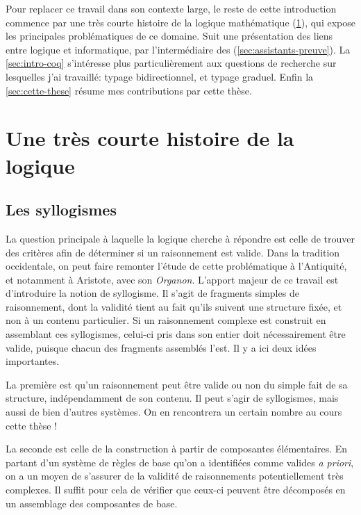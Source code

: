 Pour replacer ce travail dans son contexte large, le reste de cette introduction
commence par une très courte histoire de la logique mathématique
(\cref{sec:logique-histoire}), qui expose les principales problématiques de ce domaine.
Suit une présentation des liens entre logique et informatique, par
l’intermédiaire des  (\cref{sec:assistants-preuve}).
La \cref{sec:intro-coq} s’intéresse plus particulièrement aux questions
de recherche sur lesquelles j’ai travaillé: typage bidirectionnel,  et typage
graduel.
Enfin la \cref{sec:cette-these} résume mes contributions par cette thèse.

\section{Une très courte histoire de la logique}
\label{sec:logique-histoire}

\subsection{Les syllogismes}

La question principale à laquelle la logique cherche à répondre
est celle de trouver des critères afin de déterminer si un raisonnement est valide.
Dans la tradition occidentale, on peut faire remonter l’étude de cette problématique
à l’Antiquité, et notamment à Aristote, avec son \textit{Organon}.
L’apport majeur de ce travail est d’introduire la notion de syllogisme.
Il s’agit de fragments simples de raisonnement, dont la validité tient au fait qu’ils
suivent une structure fixée, et non à un contenu particulier.%
Si un raisonnement complexe est construit en assemblant ces syllogismes,
celui-ci pris dans son entier doit nécessairement être valide, puisque
chacun des fragments assemblés l’est. Il y a ici deux idées importantes.

La première est qu'un raisonnement peut être valide ou non du simple fait de sa structure, indépendamment de son contenu.
Il peut s’agir de syllogismes, mais aussi de bien d’autres systèmes. On en rencontrera
un certain nombre au cours cette thèse !

La seconde est celle de la construction à partir de composantes élémentaires. En
partant d’un système de règles de base qu’on a identifiées comme valides 
\textit{a priori}, on a un moyen de s’assurer de la validité
de raisonnements potentiellement très complexes.
Il suffit pour cela de vérifier que ceux-ci peuvent être décomposés en un
assemblage des composantes de base.

